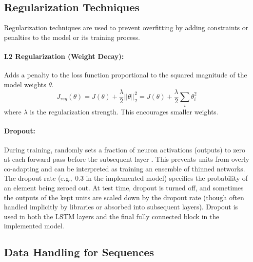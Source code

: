 \begin{appendices}
  \subsection{Regularization Techniques}
  Regularization techniques are used to prevent overfitting by adding constraints or penalties to the model or its training process.

  \paragraph{L2 Regularization (Weight Decay):}
  Adds a penalty to the loss function proportional to the squared magnitude of the model weights \( \theta \).
  \begin{equation}
    J_{reg}(\theta) = J(\theta) + \frac{\lambda}{2} ||\theta||_2^2 = J(\theta) + \frac{\lambda}{2} \sum_i \theta_i^2
  \end{equation}
  where \( \lambda \) is the regularization strength. This encourages smaller weights.

  \paragraph{Dropout:}
  During training, randomly sets a fraction of neuron activations (outputs) to zero at each forward pass before the subsequent layer \autocite{srivastava2014dropout}. This prevents units from overly co-adapting and can be interpreted as training an ensemble of thinned networks. The dropout rate (e.g., 0.3 in the implemented model) specifies the probability of an element being zeroed out. At test time, dropout is turned off, and sometimes the outputs of the kept units are scaled down by the dropout rate (though often handled implicitly by libraries or absorbed into subsequent layers). Dropout is used in both the LSTM layers and the final fully connected block in the implemented model.

  \subsection{Data Handling for Sequences}


\end{appendices}
